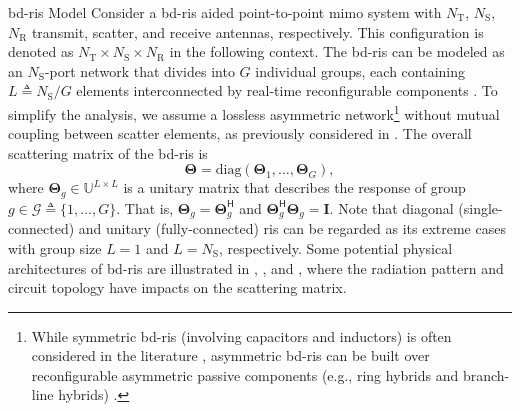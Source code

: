 \documentclass[journal]{IEEEtran}
\begin{document}
\begin{section}{\gls{bd}-\gls{ris} Model}
	Consider a \gls{bd}-\gls{ris} aided point-to-point \gls{mimo} system with $N_\mathrm{T}$, $N_\mathrm{S}$, $N_\mathrm{R}$ transmit, scatter, and receive antennas, respectively.
	This configuration is denoted as $N_\mathrm{T} \times N_\mathrm{S} \times N_\mathrm{R}$ in the following context.
	The \gls{bd}-\gls{ris} can be modeled as an $N_\mathrm{S}$-port network \cite{Ivrlac2010} that divides into $G$ individual groups, each containing $L \triangleq N_\mathrm{S} / G$ elements interconnected by real-time reconfigurable components \cite{Shen2020a}.
	To simplify the analysis, we assume a lossless asymmetric network\footnote{While symmetric \gls{bd}-\gls{ris} (involving capacitors and inductors) is often considered in the literature \cite{Shen2020a,Nerini2023,Santamaria2023,Fang2023,Nerini2023a,Zhou2023,Li2023d,Bartoli2023}, asymmetric \gls{bd}-\gls{ris} can be built over reconfigurable asymmetric passive components (e.g., ring hybrids and branch-line hybrids) \cite{Ahn2006}.} without mutual coupling between scatter elements, as previously considered in \cite{Li2023b,Li2023c,Bartoli2023}.
	The overall scattering matrix of the \gls{bd}-\gls{ris} is
	\begin{equation}
		\mathbf{\Theta} = \mathrm{diag}(\mathbf{\Theta}_1,\ldots,\mathbf{\Theta}_G),
	\end{equation}
	where $\mathbf{\Theta}_g \in \mathbb{U}^{L \times L}$ is a unitary matrix that describes the response of group $g \in \mathcal{G} \triangleq \{1, \ldots, G\}$.
	That is, $\mathbf{\Theta}_g = \mathbf{\Theta}_g^\mathsf{H}$ and $\mathbf{\Theta}_g^\mathsf{H} \mathbf{\Theta}_g = \mathbf{I}$.
	Note that diagonal (single-connected) and unitary (fully-connected) \gls{ris} can be regarded as its extreme cases with group size $L=1$ and $L=N_\mathrm{S}$, respectively.
	Some potential physical architectures of \gls{bd}-\gls{ris} are illustrated in \cite[Fig. 3]{Shen2020a}, \cite[Fig. 5]{Li2023c}, and \cite[Fig. 2]{Nerini2023a}, where the radiation pattern and circuit topology have impacts on the scattering matrix.


\end{section}
\end{document}
